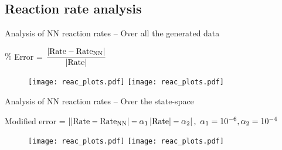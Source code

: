 \documentclass[xcolor=dvipsnames, 8pt]{beamer} %
\begin{document}
\subsection{Reaction rate analysis}
\begin{frame}{Analysis of NN reaction rates -- Over all the generated data}
	
	\centering
	$\%$ Error = $\dfrac{\left| \textnormal{Rate} - 
	\textnormal{Rate}_{\textnormal{NN}} \right|}{\left| \textnormal{Rate} \right|}$

	\begin{figure}
		\centering
		\texttt{[image: reac\_plots.pdf]}
		\texttt{[image: reac\_plots.pdf]}
	\end{figure}

\end{frame}

\begin{frame}{Analysis of NN reaction rates -- Over the state-space}
	
	\centering
	Modified error = $\norm{\norm{\textnormal{Rate} - 
						\textnormal{Rate}_{\textnormal{NN}}} - 
						\alpha_1\norm{\textnormal{Rate}} - \alpha_2}, \ 
						\alpha_1 = 10^{-6}, \alpha_2 = 10^{-4}$
	\begin{figure}
		\centering
		\texttt{[image: reac\_plots.pdf]}
		\texttt{[image: reac\_plots.pdf]}
	\end{figure}
	
\end{frame}
\end{document}
